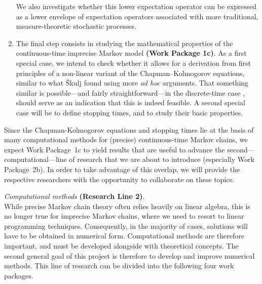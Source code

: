 \documentclass[11pt,dvipsnames,usenames,a4paper]{article}
\begin{document}
\begin{enumerate}[label=\tiny$\blacksquare$,leftmargin=*,noitemsep]
We also investigate whether this lower expectation operator can be expressed as a lower envelope of expectation operators associated with more traditional, measure-theoretic stochastic processes.
\item The final step consists in studying the mathematical properties of the continuous-time imprecise Markov model {\bf(Work Package 1c)}.
As a first special case, we intend to check whether it allows for a derivation from first principles of a non-linear variant of the Chapman--Kolmogorov equations, similar to what \v{S}kulj \cite{skulj2015:continuous:bounds} found using more {\itshape ad hoc} arguments.
That something similar is possible---and fairly straightforward---in the discrete-time case \cite{cooman2008}, should serve as an indication that this is indeed feasible. 
A second special case will be to define stopping times, and to study their basic properties.
\end{enumerate}
Since the Chapman-Kolmogorov equations and stopping times lie at the basis of many computational methods for (precise) continuous-time Markov chains, we expect Work Package~1c to yield results that are useful to advance the second---computational---line of research that we are about to introduce (especially Work Package~2b). In order to take advantage of this overlap, we will provide the respective researchers with the opportunity to collaborate on these topics.

\emph{Computational methods} {\bf (Research Line 2)}.\\[3pt]
While precise Markov chain theory often relies heavily on linear algebra, this is no longer true for imprecise Markov chains, where we need to resort to linear programming techniques. 
Consequently, in the majority of cases, solutions will have to be obtained in numerical form.
Computational methods are therefore important, and must be developed alongside with theoretical concepts. 
The second general goal of this project is therefore to develop and improve numerical methods. This line of research can be divided into the following four work packages.
\end{document}

